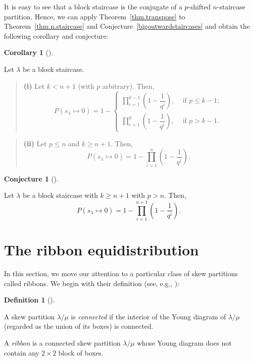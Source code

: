 \documentclass[numbers=enddot,12pt,final,onecolumn,notitlepage]{scrartcl}%
\theoremstyle{definition}
\newtheorem{defi}[theo]{Definition}
\newenvironment{definition}[1][]
{\begin{defi}[#1]\begin{leftbar}}
{\end{leftbar}\end{defi}}
\newtheorem{coro}[theo]{Corollary}
\newenvironment{corollary}[1][]
{\begin{coro}[#1]\begin{leftbar}}
{\end{leftbar}\end{coro}}
\newtheorem{conj}[theo]{Conjecture}
\newenvironment{conjecture}[1][]
{\begin{conj}[#1]\begin{leftbar}}
{\end{leftbar}\end{conj}}
\newenvironment{statement}{\begin{quote}}{\end{quote}}
\let\prodnonlimits\prod
\renewcommand{\prod}{\prodnonlimits\limits}
\renewcommand{\leq}{\leqslant}
\renewcommand{\geq}{\geqslant}
\theoremstyle{plainsl}
\begin{document}
It is easy to see that a block staircase is the conjugate of a $p$-shifted $n$-staircase partition.
Hence, we can apply Theorem~\ref{thm.transpose} to Theorem~\ref{thm.n.staircase} and Conjecture~\ref{bigoutwardstaircases}
and obtain the following corollary and conjecture:
\begin{corollary}
\label{crl.n.staircase}

Let $\lambda$ be a block staircase.

\begin{statement}
\textbf{(i)} Let $k < n+1$ (with $p$ arbitrary). Then,
\[
P(s_{\lambda} \mapsto 0) =
1 -
\begin{cases}
\prod_{i=1}^{k-1} \left(  1-\dfrac{1}{q^{i}}\right) ,
& \text{ if } p \leq k-1; \\
\prod_{i=1}^{k} \left(  1-\dfrac{1}{q^{i}}\right) ,
& \text{ if } p > k-1.
\end{cases}
\]
\end{statement}

\begin{statement}
\textbf{(ii)} Let $p \leq n$ and $k \geq n+1$. Then,
\[
P(s_{\lambda} \mapsto 0) = 1- \prod_{i=1}^{n} \left(  1-\dfrac{1}{q^{i}}\right) .
\]
\end{statement}
\end{corollary}

\begin{conjecture}
\label{bigoutwardblockstaircases}
Let $\lambda$ be a block staircase with $k \geq n+1$ with $p > n$.  Then,
\[
P(s_{\lambda} \mapsto 0) = 1-\prod_{i=1}^{n+1} \left(  1-\dfrac{1}{q^{i}}\right).
\]
\end{conjecture}

\section{The ribbon equidistribution}

In this section, we move our attention to a particular class of skew partitions called ribbons. We begin with their definition (see, e.g., {\cite[\S7.17]{EC2}}):

\begin{definition}
A skew partition $\lambda/\mu$ is \emph{connected} if the interior of the Young diagram of $\lambda/\mu$ (regarded as the union of its boxes) is connected.

A \emph{ribbon} is a connected skew partition $\lambda/\mu$ whose Young diagram does not contain any $2 \times 2$ block of boxes.
\end{definition}
\end{document}
